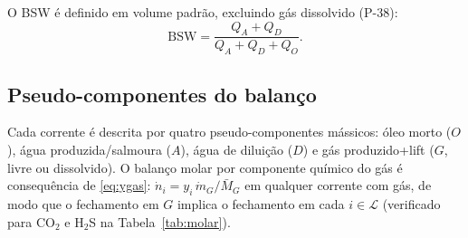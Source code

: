 \documentclass[11pt,a4paper]{article}
\numberwithin{equation}{section}
\numberwithin{table}{section}
\numberwithin{figure}{section}
\begin{document}
O BSW é definido em volume padrão, excluindo gás dissolvido (P-38):
\begin{equation}\label{eq:bsw}
\mathrm{BSW}=\frac{Q_{A}+Q_{D}}{Q_{A}+Q_{D}+Q_{O}}.
\end{equation}

\subsection{Pseudo-componentes do balanço}
Cada corrente é descrita por quatro pseudo-componentes mássicos: óleo morto ($O$), água produzida/salmoura ($A$), água de diluição ($D$) e gás produzido+lift ($G$, livre ou dissolvido). O balanço molar por componente químico do gás é consequência de \eqref{eq:ygas}: $\dot n_{i}=y_i\,\dot m_G/\bar M_G$ em qualquer corrente com gás, de modo que o fechamento em $G$ implica o fechamento em cada $i\in\mathcal L$ (verificado para CO$_2$ e H$_2$S na Tabela~\ref{tab:molar}).
\end{document}
